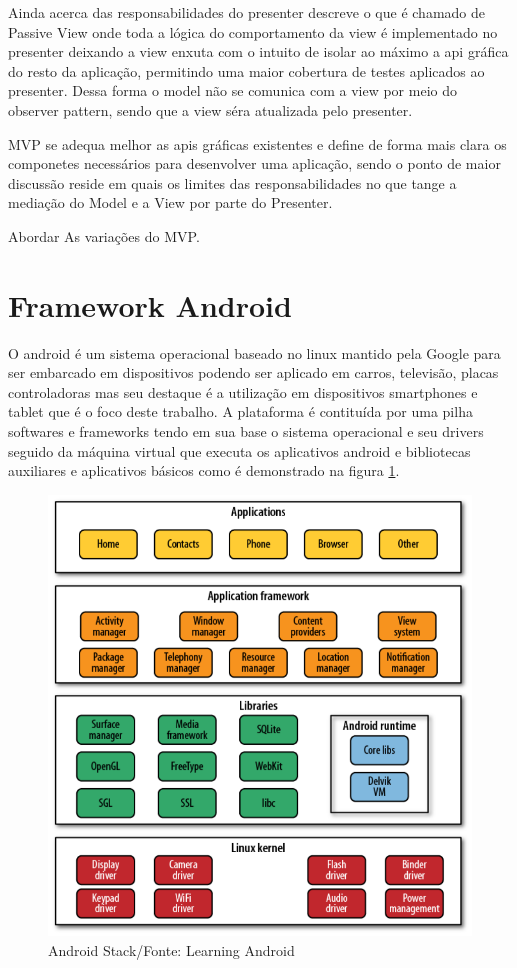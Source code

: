 Ainda acerca das responsabilidades do presenter  descreve
o que é chamado de Passive View onde toda a lógica do comportamento da view é
implementado no presenter deixando a view enxuta com o intuito de isolar ao
máximo a api gráfica do resto da aplicação, permitindo uma maior cobertura de
testes aplicados ao presenter. Dessa forma o model não se comunica com a view
por meio do observer pattern, sendo que a view séra atualizada pelo presenter.


MVP se adequa melhor as apis gráficas existentes e define de forma mais clara os
componetes necessários para desenvolver uma aplicação, sendo o ponto de maior
discussão reside em quais os limites das responsabilidades no que tange a
mediação do Model e a View por parte do Presenter.

Abordar As variações do MVP.

\section{Framework Android}
 

O android é um sistema operacional baseado no linux mantido pela Google para
ser embarcado em dispositivos podendo ser aplicado em carros, televisão, placas
controladoras mas seu destaque é a utilização em dispositivos smartphones e
tablet que é o foco deste trabalho. A plataforma é contituída por uma pilha
softwares e frameworks tendo em sua base o sistema operacional e seu drivers
seguido da máquina virtual que executa os aplicativos android e bibliotecas
auxiliares e aplicativos básicos como é demonstrado na figura \ref{android_stack}.

\begin{figure}[h]
	\centering
	\includegraphics[scale=0.5]{img/android_stack.png}
	\caption{Android Stack/Fonte: Learning Android}
	\label{android_stack}
\end{figure}

